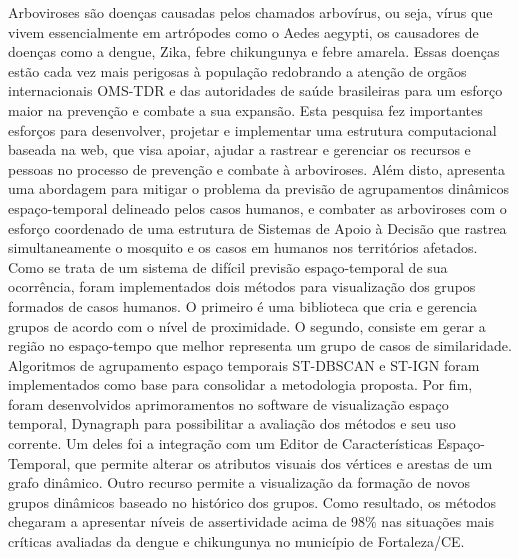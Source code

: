 Arboviroses são doenças causadas pelos chamados arbovírus, ou seja, vírus que vivem essencialmente em artrópodes como o Aedes aegypti, os causadores de doenças como a dengue, Zika, febre chikungunya e febre amarela. Essas doenças estão cada vez mais perigosas à população redobrando a atenção de orgãos internacionais OMS-TDR e das autoridades de saúde brasileiras para um esforço maior na prevenção e combate a sua expansão. Esta pesquisa fez importantes esforços para desenvolver, projetar e implementar uma estrutura computacional baseada na web, que visa apoiar, ajudar a rastrear e gerenciar os recursos e pessoas no processo de prevenção e combate à arboviroses. Além disto, apresenta uma abordagem para mitigar o problema da previsão de agrupamentos dinâmicos espaço-temporal delineado pelos casos humanos, e combater as arboviroses com o esforço coordenado de uma estrutura de Sistemas de Apoio à Decisão que rastrea simultaneamente o mosquito e os casos em humanos nos territórios afetados.
Como se trata de um sistema de difícil previsão espaço-temporal de sua ocorrência, foram implementados dois métodos para visualização dos grupos formados de casos humanos.
O primeiro é uma biblioteca que cria e gerencia grupos de acordo com o nível de proximidade.
O segundo, consiste em gerar a região no espaço-tempo que melhor representa um grupo de casos de similaridade. Algoritmos de agrupamento espaço temporais ST-DBSCAN e ST-IGN foram implementados como base para consolidar a metodologia proposta.
Por fim, foram desenvolvidos  aprimoramentos no software de visualização espaço temporal, Dynagraph para possibilitar a avaliação dos métodos e seu uso corrente. Um deles foi a integração com um Editor de
Características Espaço-Temporal, que permite alterar os atributos visuais dos vértices e arestas de um
grafo dinâmico. Outro recurso permite a visualização da formação de novos grupos dinâmicos baseado no histórico dos grupos.
Como resultado, os métodos chegaram a apresentar níveis de assertividade acima de 98\% nas situações mais críticas avaliadas da dengue e chikungunya no município de Fortaleza/CE.


